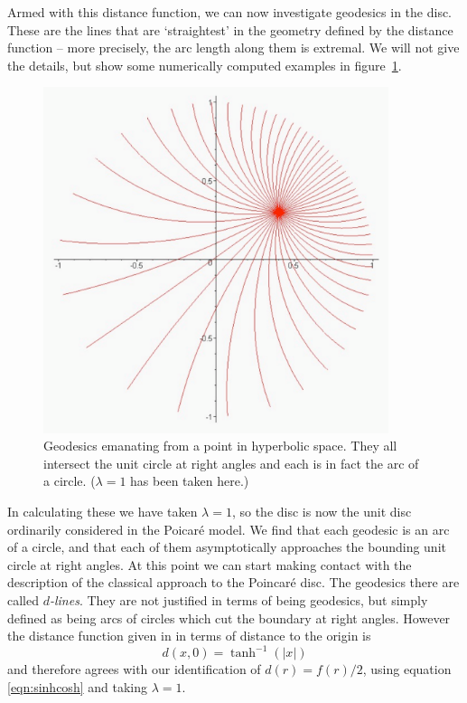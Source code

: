 Armed with this distance function, we can now investigate
geodesics in the disc. These are the lines that are `straightest'
in the geometry defined by the distance function -- more precisely,
the arc length along them is extremal. We will not give the
details, but show some numerically computed examples in
figure~\ref{fig:hyper-geos}.
%
\begin{figure} \label{fig:hyper-geos}
\centerline{\includegraphics[width=0.9\textwidth]{hyper_geos}}
\caption{Geodesics emanating from a point in hyperbolic space.
They all intersect the unit circle at right angles and each is in
fact the arc of a circle. ($\lambda=1$ has been taken here.) }
\end{figure}
%
In calculating these we have taken $\lambda=1$, so the disc is now
the unit disc ordinarily considered in the Poicar\'e model. We
find that each geodesic is an arc of a circle, and that each of
them asymptotically approaches the bounding unit circle at right
angles. At this point we can start making contact with the
description of the classical approach to the Poincar\'e
disc\cite{brannan}. The geodesics there are called {\em $d$-lines}.
They are not justified in terms of being geodesics, but simply
defined as being arcs of circles which cut the boundary at right
angles. However the distance function given in \cite{brannan}
in terms of distance to the origin is
%
\begin{equation}
d(x,0) = \tanh^{-1}(|x|)
\end{equation}
%
and therefore agrees with our identification of $d(r)=
f(r)/2$, using equation \ref{eqn:sinhcosh} and
taking $\lambda=1$.

